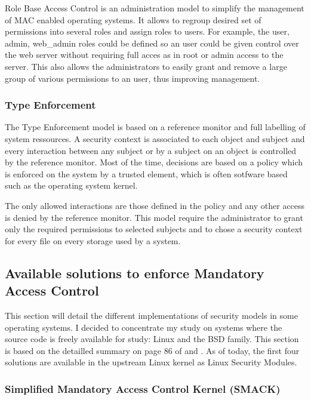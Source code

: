 \documentclass[pdftex,a4paper,titlepage,11pt]{article}
\begin{document}
Role Base Access Control is an administration model to simplify the management
of MAC enabled operating systems. It allows to regroup desired set of
permissions into several roles and assign roles to users. For example, the
user, admin, web\_admin roles could be defined so an user could be given
control over the web server without requiring full acces as in root or admin
access to the server. This also allows the administrators to easily grant and
remove a large group of various permissions to an user, thus improving
management.

\subsubsection{Type Enforcement}

The Type Enforcement model is based on a reference monitor and full labelling
of system ressources. A security context is associated to each object and
subject and every interaction between any subject or by a subject on an object
is controlled by the reference monitor. Most of the time, decisions are based
on a policy which is enforced on the system by a trusted element, which is
often sotfware based such as the operating system kernel.

\bigskip

The only allowed interactions are those defined in the policy and any other
access is denied by the reference monitor. This model require the administrator
to grant only the required permissions to selected subjects and to chose a
security context for every file on every storage used by a system.

\subsection{Available solutions to enforce Mandatory Access Control}

This section will detail the different implementations of security models in
some operating systems. I decided to concentrate my study on systems where the
source code is freely available for study: Linux and the BSD family. This
section is based on the detailled summary on page 86 of
\cite{theseJBriffaut} and \cite{maccomparison}. As of today, the first four
solutions are available in the upstream Linux kernel as Linux Security Modules.

\subsubsection{Simplified Mandatory Access Control Kernel (SMACK)}
\end{document}
